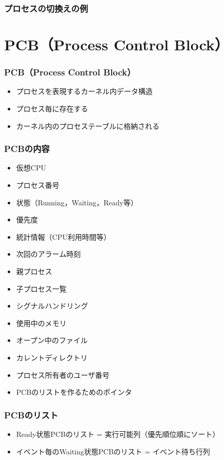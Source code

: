 \documentclass[unicode]{beamer}                   %
\begin{document}
\begin{frame}
  \frametitle{プロセスの切換えの例}
\end{frame}

\section{PCB（Process Control Block）}
\begin{frame}
  \frametitle{PCB（Process Control Block）}
  \begin{itemize}
    \item プロセスを表現するカーネル内データ構造
    \item プロセス毎に存在する
    \item カーネル内のプロセステーブルに格納される
  \end{itemize}
  \vfill
\end{frame}

\begin{frame}
  \frametitle{PCBの内容}
\begin{itemize}
\item 仮想CPU
\item プロセス番号
\item 状態（Running，Waiting，Ready等）
\item 優先度
\item 統計情報（CPU利用時間等）
\item 次回のアラーム時刻
\item 親プロセス
\item 子プロセス一覧
\item シグナルハンドリング
\item 使用中のメモリ
\item オープン中のファイル
\item カレントディレクトリ
\item プロセス所有者のユーザ番号
\item PCBのリストを作るためのポインタ
\end{itemize}
\end{frame}

\begin{frame}
  \frametitle{PCBのリスト}
  \begin{itemize}
    \item Ready状態PCBのリスト = 実行可能列（優先順位順にソート）
    \item イベント毎のWaiting状態PCBのリスト = イベント待ち行列
  \end{itemize}
  \vfill
\end{frame}
\end{document}
